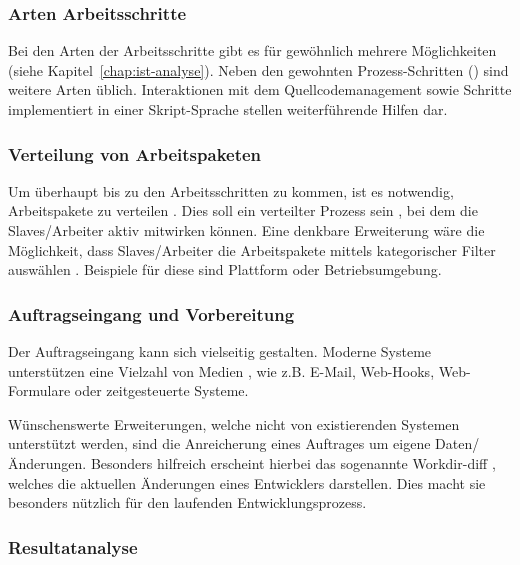 \subsubsection{Arten Arbeitsschritte}

Bei den Arten der Arbeitsschritte gibt es für gew\"ohnlich mehrere M\"oglichkeiten (siehe Kapitel~\ref{chap:ist-analyse}).
Neben den gewohnten Prozess-Schritten () sind weitere Arten \"ublich.
Interaktionen mit dem Quellcodemanagement  sowie
Schritte implementiert in einer Skript-Sprache 
stellen weiterf\"uhrende Hilfen dar.

\subsubsection{Verteilung von Arbeitspaketen}

Um \"uberhaupt bis zu den Arbeitsschritten zu kommen,
ist es notwendig, \mbox{Arbeitspakete} zu verteilen .
Dies soll ein verteilter Prozess sein ,
bei dem die Slaves/Arbeiter aktiv mitwirken k\"onnen.
Eine denkbare Erweiterung w\"are die Möglichkeit, dass Slaves/Arbeiter
die Arbeitspakete mittels kategorischer Filter auswählen .
Beispiele f\"ur diese sind Plattform oder Betriebsumgebung.

\subsubsection{Auftragseingang und Vorbereitung}


Der Auftragseingang kann sich vielseitig gestalten.
Moderne Systeme unterstützen eine Vielzahl von Medien ,
wie z.B. E-Mail, Web-Hooks, Web-Formulare oder zeitgesteuerte Systeme.

W\"unschenswerte Erweiterungen, welche nicht von existierenden Systemen unterst\"utzt werden,
sind die Anreicherung eines Auftrages um eigene Daten/\"Anderungen.
Besonders hilfreich erscheint hierbei das sogenannte Workdir-diff ,
welches die aktuellen \"Anderungen eines Entwicklers darstellen.
Dies macht sie besonders n\"utzlich f\"ur den laufenden Entwicklungsprozess.

\subsubsection{Resultatanalyse}

